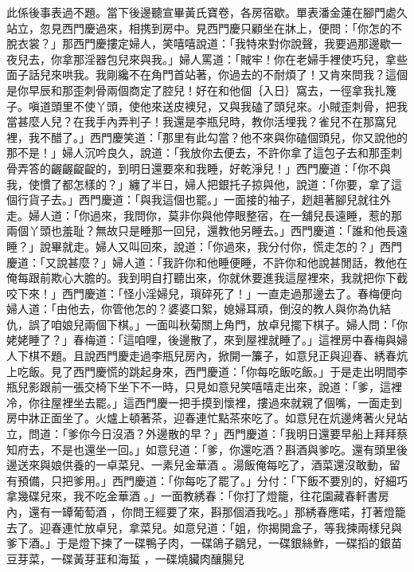 此係後事表過不題。當下後邊聽宣畢黃氏寶卷，各房宿歇。單表潘金蓮在腳門處久站立，忽見西門慶過來，相携到房中。見西門慶只顧坐在牀上，便問：「你怎的不脫衣裳？」那西門慶摟定婦人，笑嘻嘻說道：「我特來對你說聲，我要過那邊歇一夜兒去，你拿那淫器包兒來與我。」婦人罵道：「賊牢！你在老婦手裡使巧兒，拿些面子話兒來哄我。我剛纔不在角門首站著，你過去的不耐煩了！又肯來問我？這個是你早辰和那歪刺骨兩個商定了腔兒！好在和他個｛入日｝窩去，一徑拿我扎篾子。嗔道頭里不使丫頭，使他來送皮襖兒，又與我磕了頭兒來。小賊歪刺骨，把我當甚麼人兒？在我手內弄判子！我還是李瓶兒時，教你活埋我？雀兒不在那窩兒裡，我不醋了。」西門慶笑道：「那里有此勾當？他不來與你磕個頭兒，你又說他的那不是！」婦人沉吟良久，說道：「我放你去便去，不許你拿了這包子去和那歪刺骨弄答的齷齷齪齪的，到明日還要來和我睡，好乾淨兒！」西門慶道：「你不與我，使慣了都怎樣的？」纏了半日，婦人把銀托子掠與他，說道：「你要，拿了這個行貨子去。」西門慶道：「與我這個也罷。」一面接的袖子，趔趄著腳兒就往外走。婦人道：「你過來，我問你，莫非你與他停眼整宿，在一舖兒長遠睡，惹的那兩個丫頭也羞耻？無故只是睡那一回兒，還教他另睡去。」西門慶道：「誰和他長遠睡？」說畢就走。婦人又叫回來，說道：「你過來，我分付你，慌走怎的？」西門慶道：「又說甚麼？」婦人道：「我許你和他睡便睡，不許你和他說甚閒話，教他在俺每跟前欺心大膽的。我到明自打聽出來，你就休要進我這屋裡來，我就把你下截咬下來！」西門慶道：「怪小淫婦兒，瑣碎死了！」一直走過那邊去了。春梅便向婦人道：「由他去，你管他怎的？婆婆口絮，媳婦耳頑，倒沒的教人與你為仇結仇，誤了咱娘兒兩個下棋。」一面叫秋菊關上角門，放卓兒擺下棋子。婦人問：「你姥姥睡了？」春梅道：「這咱哩，後邊散了，來到屋裡就睡了。」這裡房中春梅與婦人下棋不題。且說西門慶走過李瓶兒房內，掀開一簾子，如意兒正與迎春、綉春炕上吃飯。見了西門慶慌的跳起身來，西門慶道：「你每吃飯吃飯。」于是走出明間李瓶兒影跟前一張交椅下坐下不一時，只見如意兒笑嘻嘻走出來，說道：「爹，這裡冷，你往屋裡坐去罷。」這西門慶一把手摸到懷裡，摟過來就親了個嘴，一面走到房中牀正面坐了。火爐上頓著茶，迎春連忙點茶來吃了。如意兒在炕邊烤著火兒站立，問道：「爹你今日沒酒？外邊散的早？」西門慶道：「我明日還要早船上拜拜蔡知府去，不是也還坐一回。」如意兒道：「爹，你還吃酒？斟酒與爹吃。還有頭里後邊送來與娘供養的一卓菜兒、一素兒金華酒 。湯飯俺每吃了，酒菜還沒敢動，留有預備，只把爹用。」西門慶道：「你每吃了罷了。」分付：「下飯不要別的，好細巧拿幾碟兒來，我不吃金華酒 。」一面教綉春：「你打了燈籠，往花園藏春軒書房內，還有一罈葡萄酒 ，你問王經要了來，斟那個酒我吃。」那綉春應喏，打著燈籠去了。迎春連忙放卓兒，拿菜兒。如意兒道：「姐，你揭開盒子，等我揀兩樣兒與爹下酒。」于是燈下揀了一碟鴨子肉，一碟鴿子鶵兒，一碟銀絲鮓，一碟搯的銀苗豆芽菜，一碟黃芽韮和海蜇 ，一碟燒臟肉釀腸兒 
